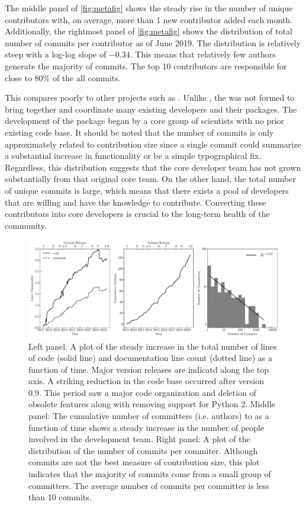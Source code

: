 The middle panel of \autoref{fig:metafig} shows the steady rise in the number of unique contributors with, on average, more than 1 new contributor added each month.
Additionally, the rightmost panel of \autoref{fig:metafig} shows the distribution of total number of commits per contributor as of June 2019.
The distribution is relatively steep with a log-log slope of $-0.34$.
This means that relatively few authors generate the majority of commits.
The top 10 contributors are responsible for close to 80\% of the all commits.

This compares poorly to other projects such as \astropy \citep{astropy2018}.
Unlike \astropy, the \sunpyproj was not formed to bring together and coordinate many existing developers and their \python packages.
The development of the \sunpypkg package began by a core group of scientists with no prior existing code base.
It should be noted that the number of commits is only approximately related to contribution size since a single commit could summarize a substantial increase in functionality or be a simple typographical fix.
Regardless, this distribution suggests that the core developer team has not grown substantially from that original core team.
On the other hand, the total number of unique commits is large, which means that there exists a pool of \sunpypkg developers that are willing and have the knowledge to contribute.
Converting these contributors into core developers is crucial to the long-term health of the community.


\begin{figure}
    \center
    \includegraphics[width = 1.0\textwidth]{figures/dev_meta.pdf}
    \caption{Left panel: A plot of the steady increase in the total number of lines of code (solid line) and documentation line count (dotted line) as a function of time.
	Major version releases are indicatd along the top axis.
	A striking reduction in the code base occurred after version 0.9.
	This period saw a major code organization and deletion of obsolete features along with removing support for Python 2.
	Middle panel: The cumulative number of committers (i.e. authors) to \sunpypkg as a function of time shows a steady increase in the number of people involved in the development team.
	Right panel: A plot of the distribution of the number of commits per commiter.
	Although commits are not the best measure of contribution size, this plot indicates that the majority of commits come from a small group of committers. The average number of commits per committer is less than 10 commits.}
\label{fig:metafig}
\end{figure}
